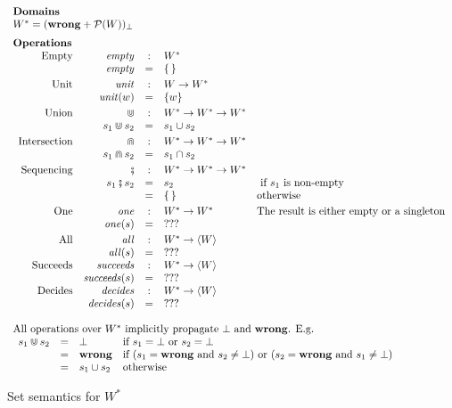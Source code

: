 \documentclass[acmsmall,review,dvipsnames]{acmart}
\newcommand{\tuple}[1]{\langle #1 \rangle}
\newcommand{\Value}{W}
\newcommand{\mtype}{\Value^{*}}
\newcommand{\mempty}{\mathit{empty}}
\newcommand{\munit}{\mathit{unit}}
\newcommand{\mintersect}{\Cap}
\newcommand{\munion}{\Cup}
\newcommand{\msemi}{\fatsemi}
\newcommand{\mone}{\mathit{one}}
\newcommand{\mall}{\mathit{all}}
\newcommand{\msucceeds}{\mathit{succeeds}}
\newcommand{\mdecides}{\mathit{decides}}
\newcommand{\mlift}[1]{#1_{\bot}}
\newcommand{\powerset}[1]{{\mathcal P}(#1)}
\newcommand{\wrong}{\mathbf{wrong}}
\begin{document}
\begin{figure}
$$
\begin{array}{l}
\text{\bf Domains} \\
\mtype  =  \mlift{(\wrong + \powerset{\Value})} \\[2mm]
\text{\bf Operations} \\
\begin{array}{rrcll}
\text{Empty}        & \mempty & : &  \mtype \\
                    & \mempty & = & \{ \, \} \\[1mm]
\text{Unit}    & \munit & : & \Value \rightarrow \mtype \\
               & \munit(w) & = & \{ w  \} \\[1mm]
\text{Union}   & \munion & : & \mtype \rightarrow \mtype \rightarrow \mtype \\
               &  s_1 \munion s_2 & = & s_1 \cup s_2 \\[1mm]
\text{Intersection} & \mintersect & : & \mtype \rightarrow \mtype \rightarrow \mtype \\
                    &  s_1 \mintersect s_2 & = & s_1 \cap s_2 \\[1mm]
\text{Sequencing}   & \msemi & : & \mtype \rightarrow \mtype \rightarrow \mtype \\
                    &  s_1 \msemi s_2 & = & s_2 & \text{ if $s_1$ is non-empty} \\
            &          & = & \{\,\} & \text{otherwise} \\[1mm]
\text{One}          &   \mone  & : & \mtype \rightarrow \mtype & \text{The result is either empty or a singleton}\\
  & \mone(s) & = & ??? \\[1mm]
\text{All}          &   \mall  & : & \mtype \rightarrow \tuple{\Value} \\
  & \mall(s) & = & ??? \\
\text{Succeeds}          &   \msucceeds  & : & \mtype \rightarrow \tuple{\Value} \\
  & \msucceeds(s) & = & ??? \\
\text{Decides}          &   \mdecides  & : & \mtype \rightarrow \tuple{\Value} \\
  & \mdecides(s) & = & ??? \\
\end{array} \\ \\
\text{All operations over $\mtype$ implicitly propagate $\bot$ and $\wrong$.  E.g.}\\
  \begin{array}{rcll}
    s_1 \munion s_2 & = & \bot & \text{if $s_1=\bot$ or $s_2=\bot$} \\
                    & = & \wrong & \text{if $(s_1=\wrong$ and $s_2 \neq \bot)$ or
                    $(s_2=\wrong$ and $s_1 \neq \bot)$} \\
                    & = & s_1 \cup s_2 & \text{otherwise}
  \end{array}
\end{array}
$$
\caption{Set semantics for $\mtype$}
\label{fig:set-sem}
\end{figure}
\end{document}
